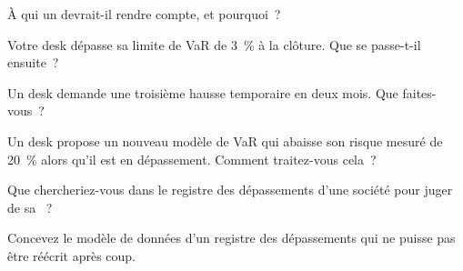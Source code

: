 \begin{interviewq}\label{iq:fm:the-risk-management-function:1}
À qui un  devrait-il rendre compte, et pourquoi~?
\end{interviewq}

\begin{interviewq}\label{iq:fm:the-risk-management-function:2}
Votre desk dépasse sa limite de VaR de 3~\% à la clôture. Que se passe-t-il ensuite~?
\end{interviewq}

\begin{interviewq}\label{iq:fm:the-risk-management-function:3}
Un desk demande une troisième hausse temporaire en deux mois. Que faites-vous~?
\end{interviewq}

\begin{interviewq}\label{iq:fm:the-risk-management-function:4}
Un desk propose un nouveau modèle de VaR qui abaisse son risque mesuré de 20~\% alors qu'il est en dépassement. Comment traitez-vous cela~?
\end{interviewq}

\begin{interviewq}\label{iq:fm:the-risk-management-function:5}
Que chercheriez-vous dans le registre des dépassements d'une société pour juger de sa ~?
\end{interviewq}

\begin{interviewq}\label{iq:fm:the-risk-management-function:6}
Concevez le modèle de données d'un registre des dépassements qui ne puisse pas être réécrit après coup.
\end{interviewq}
